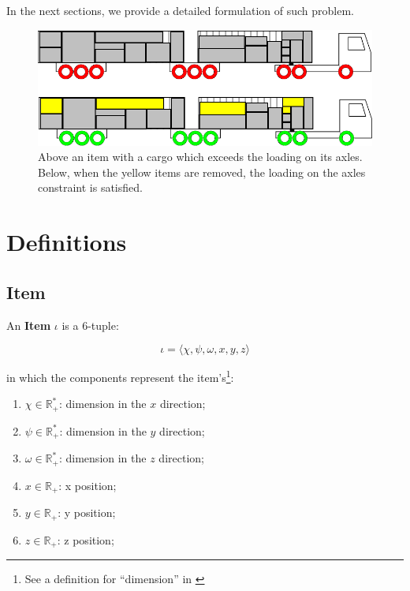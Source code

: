 \documentclass{article}
\newcommand{\realnonnegative}{\ensuremath{\mathbb{R}_{+}}\xspace}
\newcommand{\realpositive}{\ensuremath{\mathbb{R}_{+}^{*}}\xspace}
\newcommand{\tuple}[1]{#1-tuple\xspace}
\newcommand{\OrderedSet}[1]{\ensuremath{\langle#1\rangle}\xspace}
\newcommand{\itemO}{\ensuremath{\iota}\xspace}
\newcommand{\lx}{\ensuremath{\chi}\xspace}
\newcommand{\ly}{\ensuremath{\psi}\xspace}
\newcommand{\lz}{\ensuremath{\omega}\xspace}
\newcommand{\px}{\ensuremath{x}\xspace}
\newcommand{\py}{\ensuremath{y}\xspace}
\newcommand{\pz}{\ensuremath{z}\xspace}
\begin{document}
In the next sections, we provide a detailed formulation of such problem.

\begin{figure}
	\centering
	\includegraphics[width=\textwidth]{images/example_remove_items_from_vehicle.png}
	\caption{Above an item with a cargo which exceeds the loading on its axles. Below, when the yellow items are removed, the loading on the axles constraint is satisfied.}
	\label{fig:example remove items}
\end{figure}

\section{Definitions}

\subsection{Item}

An \textbf{Item} \itemO is a \tuple{6}:

\begin{equation}
	\label{def:item}
	\itemO = \OrderedSet{
		\lx,
		\ly,
		\lz,
		\px,
		\py,
		\pz
	}
\end{equation}

in which the components represent the item's\footnote{See a definition for ``dimension'' in \cite{bib:dict-dimension}}:

\begin{enumerate}
	\item $\lx \in \realpositive$: dimension in the \px direction;
	\item $\ly \in \realpositive$: dimension in the \py direction;
	\item $\lz\in \realpositive$: dimension in the \pz direction;
	\item $\px \in \realnonnegative$: x position;
	\item $\py \in \realnonnegative$: y position;
	\item $\pz \in \realnonnegative$: z position;
\end{enumerate}
\end{document}
